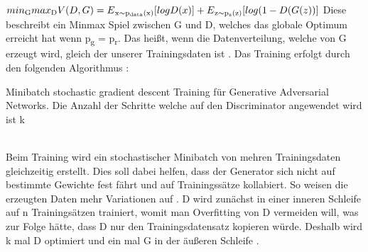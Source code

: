 \documentclass{llncs}
\begin{document}
\begin{math}
min\textsubscript{G} max\textsubscript{D}V(D,G)=E\textsubscript{x$\sim$p\textsubscript{data}(x)}[logD(x)]  + E\textsubscript{z$\sim$p\textsubscript{z}(z)}[log(1-D(G(z))]
\\\\             
\end{math}
Diese beschreibt ein Minmax Spiel zwischen G und D, welches das globale Optimum erreicht hat wenn p\textsubscript{g} = p\textsubscript{r}. Das heißt, wenn die Datenverteilung, welche von G erzeugt wird, gleich der unserer Trainingsdaten ist \cite{goodfellow2014}. 
\pagebreak\linebreak
Das Training erfolgt durch den folgenden Algorithmus  \cite{goodfellow2014}:
\\
\begin{algorithm}[H]
		\caption{Minibatch stochastic gradient descent Training für Generative Adversarial Networks. Die Anzahl der Schritte welche auf den Discriminator angewendet wird ist k }	
\end{algorithm}
~\\
Beim Training wird ein stochastischer Minibatch von mehren Trainingsdaten gleichzeitig erstellt. Dies soll dabei helfen, dass der Generator sich nicht auf bestimmte Gewichte fest fährt und auf Trainingssätze kollabiert. So weisen die erzeugten Daten mehr Variationen auf \cite{improvingan}. D wird zunächst in einer inneren Schleife auf n Trainingsätzen trainiert, womit man Overfitting von D vermeiden will, was zur Folge hätte, dass D nur den Trainingsdatensatz kopieren würde. Deshalb wird k mal D optimiert und ein mal G in der äußeren Schleife  \cite{goodfellow2014}. 
\end{document}
